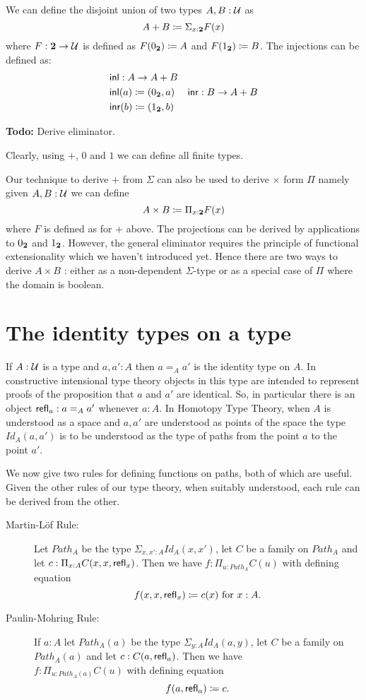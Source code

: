 We can define the disjoint union of two types $A,B:\mathcal{U}$ as
\[A + B \coloneqq \Sigma_{x:\mathbf{2}}F(x)\]
where $F : \mathbf{2} \to \mathcal{U}$ is
defined as $F(0_\mathbf{2}) \coloneqq A$ and $F(1_\mathbf{2})\coloneqq B$. The
injections can be defined as:
\begin{align*}
& \mathsf{inl} :  A \to A+B\\
& \mathsf{inl}(a) \coloneqq (0_\mathbf{2},a)
& \mathsf{inr} :  B \to A+B\\
& \mathsf{inr}(b) \coloneqq (1_\mathbf{2},b)
\end{align*}

\textbf{Todo:} Derive eliminator.

Clearly, using $+$, $0$ and $1$ we can define all finite types.

Our technique to derive $+$ from $\Sigma$ can also be used to derive
$\times$ form $\Pi$ namely given $A,B:\mathcal{U}$ we can define 
\[ A \times B \coloneqq \Pi_{x:\mathbf{2}}F(x)\]
where $F$ is defined as for $+$ above. The projections can be derived
by applications to $0_\mathbf{2}$ and $1_\mathbf{2}$. However, the general
eliminator requires the principle of functional extensionality which
we haven't introduced yet. Hence there are two ways to derive $A\times
B$ : either as a non-dependent $\Sigma$-type or as a special case of
$\Pi$ where the domain is boolean. 

\section{The identity types on a type}
\label{sec:identity-types}

If $A:\mathcal{U}$ is a type and $a,a':A$ then $a =_A a'$ is the identity type on $A$.  
In constructive intensional type theory objects in this type are
intended to represent proofs of the proposition that $a$ and $a'$ are
identical.  So, in particular there is an object $\mathsf{refl}_{a}: a =_A a'$ whenever $a:A$.  In Homotopy Type Theory, when $A$ is understood as a space and $a,a'$ are understood as points of the space the type $Id_A(a,a')$ is to be understood as the type of paths from the point $a$ to the point $a'$.

We now give two rules for defining functions on paths, both of which are useful.  Given the other rules of our type theory, when suitably understood, each rule can be derived from the other. 

\begin{description}
\item[Martin-L\"{o}f Rule:] Let $Path_A$ be the type $\Sigma_{x,x':A}Id_A(x,x')$, let $C$ be a family on $Path_A$ and let $c:\Pi_{x:A}C(x,x,\mathsf{refl}_{x})$.  Then we have $f:\Pi_{u:Path_A}C(u)$ with defining equation
  \[ f(x,x,\mathsf{refl}_{x})\coloneqq c(x)\mbox{ for } x:A.\]
\item[Paulin-Mohring Rule:] If $a:A$ let $Path_A(a)$ be the type $\Sigma_{y:A}Id_A(a,y)$, let $C$ be a family on $Path_A(a)$ and let $c:C(a,\mathsf{refl}_{a})$. Then we have\\ $f:\Pi_{u:Path_A(a)}C(u)$ with defining equation
    \[ f(a,\mathsf{refl}_{a})\coloneqq c.\]
\end{description}

